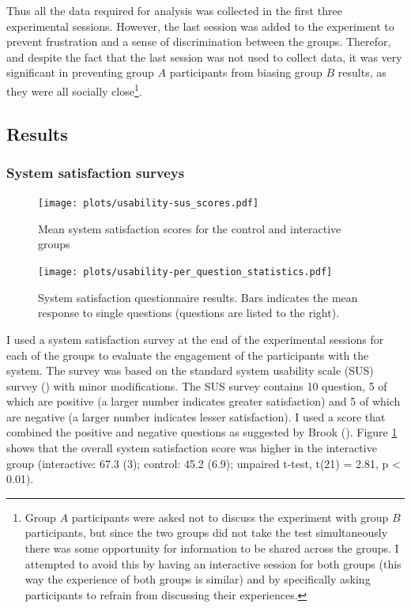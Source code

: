 \documentclass[a4paper,11pt]{article}
\begin{document}
{Thus all the data required for analysis was collected in the first three experimental sessions.
However, the last session was added to the experiment to prevent frustration and a sense of discrimination between the groups.
Therefor, and despite the fact that the last session was not used to collect data, it was very significant in preventing group $A$ participants from biasing group $B$ results, as they were all socially close\footnote{Group $A$ participants were asked not to discuss the experiment with group $B$ participants, but since the two groups did not take the test simultaneously there was some opportunity for information to be shared across the groups. I attempted to avoid this by having an interactive session for both groups (this way the experience of both groups is similar) and by specifically asking participants to refrain from discussing their experiences.}.

\subsection{Results}

\subsubsection{System satisfaction surveys}

\begin{figure}[!htb]
    \centering
    \texttt{[image: plots/usability-sus\_scores.pdf]}
    \caption{Mean system satisfaction scores for the control and interactive groups}\label{plot:usability-sus_scores}
\end{figure}

\begin{figure}[!htb]
    \centering
    \texttt{[image: plots/usability-per\_question\_statistics.pdf]}
    \caption{System satisfaction questionnaire results. Bars indicates the mean response to single questions (questions are listed to the right).}\label{plot:usability-per_question_statistics}
\end{figure}

I used a system satisfaction survey at the end of the experimental sessions for each of the groups to evaluate the engagement of the participants with the system.
The survey was based on the standard system usability scale (SUS) survey (\cite{brooke96}) with minor modifications.
The SUS survey contains 10 question, 5 of which are positive (a larger number indicates greater satisfaction) and 5 of which are negative (a larger number indicates lesser satisfaction).
I used a score that combined the positive and negative questions as suggested by Brook (\cite*{brooke96}).
Figure \ref{plot:usability-sus_scores} shows that the overall system satisfaction score was higher in the interactive group (interactive: 67.3 (3); control: 45.2 (6.9); unpaired t-test, t(21) = 2.81, p \textless{} 0.01).

}
\end{document}
